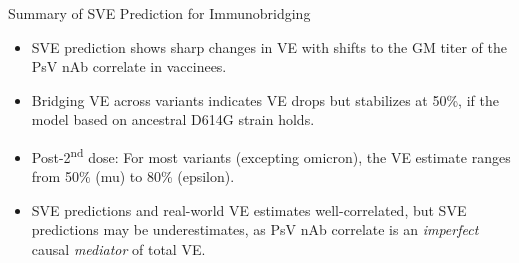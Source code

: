 \documentclass{beamer}
\begin{document}

\begin{frame}[c]{Summary of SVE Prediction for Immunobridging}

\begin{center}
\begin{itemize}
  \itemsep6pt
  \item SVE prediction shows sharp changes in VE with shifts to the GM titer of
    the PsV nAb correlate in vaccinees.
  \item Bridging VE across variants indicates VE drops but stabilizes at 50\%,
    if the model based on ancestral D614G strain holds.
  \item Post-2\textsuperscript{nd} dose: For most variants (excepting
    omicron), the VE estimate ranges from 50\% (mu) to 80\% (epsilon).
  \item SVE predictions and real-world VE estimates well-correlated, but
      SVE predictions may be underestimates, as PsV nAb correlate is an
      \textit{imperfect} causal \textit{mediator} of total VE.
\end{itemize}
\end{center}

\note{
}

\end{frame}

\end{document}
